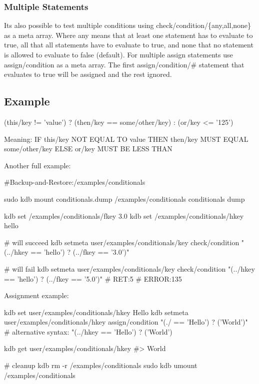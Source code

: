 \subsubsection*{Multiple Statements}

It\textquotesingle{}s also possible to test multiple conditions using {\ttfamily check/condition/\{any,all,none\}} as a meta array. Where {\ttfamily any} means that at least one statement has to evaluate to true, {\ttfamily all} that all statements have to evaluate to true, and {\ttfamily none} that no statement is allowed to evaluate to false (default). For multiple assign statements use {\ttfamily assign/condition} as a meta array. The first {\ttfamily assign/condition/\#} statement that evaluates to true will be assigned and the rest ignored.

\subsection*{Example}

\begin{DoxyVerb}(this/key  != 'value') ? (then/key == some/other/key) : (or/key <= '125')
\end{DoxyVerb}


Meaning\+: IF {\ttfamily this/key} N\+OT E\+Q\+U\+AL TO {\ttfamily \textquotesingle{}value\textquotesingle{}} T\+H\+EN {\ttfamily then/key} M\+U\+ST E\+Q\+U\+AL {\ttfamily some/other/key} E\+L\+SE {\ttfamily or/key} M\+U\+ST BE L\+E\+SS T\+H\+AN {}

Another full example\+:


\begin{DoxyCode}
#Backup-and-Restore:/examples/conditionals

sudo kdb mount conditionals.dump /examples/conditionals conditionals dump

kdb set /examples/conditionals/fkey 3.0
kdb set /examples/conditionals/hkey hello

# will succeed
kdb setmeta user/examples/conditionals/key check/condition "(../hkey == 'hello') ? (../fkey == '3.0')"

# will fail
kdb setmeta user/examples/conditionals/key check/condition "(../hkey == 'hello') ? (../fkey == '5.0')"
# RET:5
# ERROR:135
\end{DoxyCode}


Assignment example\+:


\begin{DoxyCode}
kdb set user/examples/conditionals/hkey Hello
kdb setmeta user/examples/conditionals/hkey assign/condition "(./ == 'Hello') ? ('World')"
# alternative syntax: "(../hkey == 'Hello') ? ('World')

kdb get user/examples/conditionals/hkey
#> World

# cleanup
kdb rm -r /examples/conditionals
sudo kdb umount /examples/conditionals
\end{DoxyCode}


